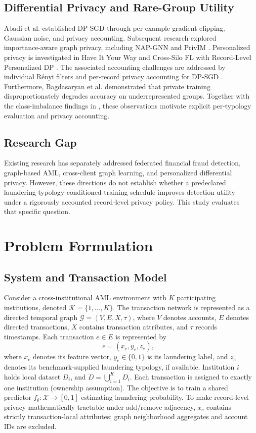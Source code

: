 \documentclass[conference]{IEEEtran}
\begin{document}
\subsection{Differential Privacy and Rare-Group Utility}
Abadi et al. \cite{b33} established DP-SGD through per-example gradient clipping, Gaussian noise, and privacy accounting. Subsequent research explored importance-aware graph privacy, including NAP-GNN and PrivIM \cite{b5}. Personalized privacy is investigated in Have It Your Way \cite{b34} and Cross-Silo FL with Record-Level Personalized DP \cite{b35}. The associated accounting challenges are addressed by individual R\'enyi filters \cite{b36} and per-record privacy accounting for DP-SGD \cite{b37}. Furthermore, Bagdasaryan et al. \cite{b38} demonstrated that private training disproportionately degrades accuracy on underrepresented groups. Together with the class-imbalance findings in \cite{b4}, these observations motivate explicit per-typology evaluation and privacy accounting.

\subsection{Research Gap}
Existing research has separately addressed federated financial fraud detection, graph-based AML, cross-client graph learning, and personalized differential privacy. However, these directions do not establish whether a predeclared laundering-typology-conditioned training schedule improves detection utility under a rigorously accounted record-level privacy policy. This study evaluates that specific question.

\section{Problem Formulation}
\subsection{System and Transaction Model}
Consider a cross-institutional AML environment with $K$ participating institutions, denoted $\mathcal{K} = \{1, \dots, K\}$. The transaction network is represented as a directed temporal graph $\mathcal{G} = (V, E, X, \tau)$, where $V$ denotes accounts, $E$ denotes directed transactions, $X$ contains transaction attributes, and $\tau$ records timestamps. Each transaction $e \in E$ is represented by
\begin{equation}
e = (x_e, y_e, z_e),
\end{equation}
where $x_e$ denotes its feature vector, $y_e \in \{0, 1\}$ is its laundering label, and $z_e$ denotes its benchmark-supplied laundering typology, if available. Institution $i$ holds local dataset $D_i$, and $D = \bigcup_{i=1}^K D_i$. Each transaction is assigned to exactly one institution (ownership assumption). The objective is to train a shared predictor $f_\theta : \mathcal{X} \to [0, 1]$ estimating laundering probability. To make record-level privacy mathematically tractable under add/remove adjacency, $x_e$ contains strictly transaction-local attributes; graph neighborhood aggregates and account IDs are excluded.
\end{document}
